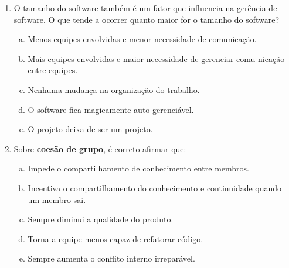 \documentclass{beamer}
\begin{document}
\begin{frame}
    \begin{enumerate}
        \justifying
        \setcounter{enumi}{22}
        \item<1-2> O tamanho do software também é um fator que influencia na gerência de software. O que tende a ocorrer quanto maior for o tamanho do software?
        \begin{enumerate}[a)]
            \justifying
            \item<1-2> Menos equipes envolvidas e menor necessidade de comunicação.
            \item<1-2> \alert<2>{Mais equipes envolvidas e maior necessidade de gerenciar comu-nicação entre equipes}.
            \item<1-2> Nenhuma mudança na organização do trabalho.
            \item<1-2> O software fica magicamente auto-gerenciável.
            \item<1-2> O projeto deixa de ser um projeto.
        \end{enumerate}
        \item<3-4> Sobre \textbf{coesão de grupo}, é correto afirmar que:
        \begin{enumerate}[a)]
            \justifying
            \item<3-4> Impede o compartilhamento de conhecimento entre membros.
            \item<3-4> \alert<4>{Incentiva o compartilhamento do conhecimento e continuidade quando um membro sai}.
            \item<3-4> Sempre diminui a qualidade do produto.
            \item<3-4> Torna a equipe menos capaz de refatorar código.
            \item<3-4> Sempre aumenta o conflito interno irreparável.
        \end{enumerate}
    \end{enumerate}
\end{frame}
\end{document}
